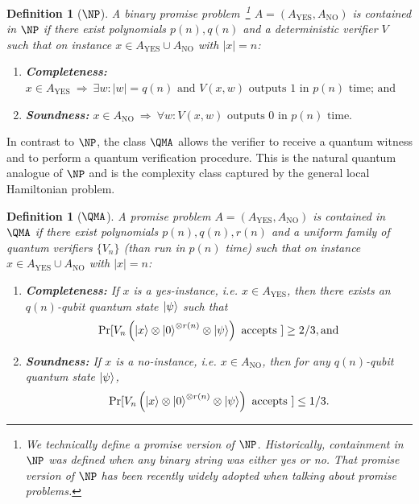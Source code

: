 \documentclass[11pt]{article}
\theoremstyle{plain}
\newtheorem{definition}[theorem]{Definition}
\begin{document}
\begin{definition}[$\NP$]
   A binary promise problem~\footnote{We technically define a promise version of $\NP$. Historically, containment in $\NP$ was defined when any binary string was either yes or no. That promise version of $\NP$ has been recently widely adopted when talking about promise problems.} $A = \left(A_{\mathrm{YES}}, A_{\mathrm{NO}}\right)$ is contained in $\NP$ if there exist polynomials $p(n), q(n)$ and a deterministic verifier $V$ such that on instance $x \in A_{\mathrm{YES}} \cup A_{\mathrm{NO}}$ with $|x| = n$:
    \begin{enumerate}
        \item \textbf{Completeness:} $x \in A_{\mathrm{YES}} \: \Longrightarrow \: \exists w: |w| = q(n) \text{ and } V(x, w) \text{ outputs } 1 \text{ in } p(n) \text{ time; and}$
        \item \textbf{Soundness:} $ x \in A_{\mathrm{NO}} \: \Longrightarrow \: \forall w: V(x, w) \text{ outputs } 0 \text{ in } p(n) \text{ time.}$
    \end{enumerate}
\end{definition}

In contrast to $\NP$, the class $\QMA$ allows the verifier to receive a quantum witness and to perform a quantum verification procedure.  This is the natural quantum analogue of $\NP$ and is the complexity class captured by the general local Hamiltonian problem.

\begin{definition}[$\QMA$]
   A promise problem $A = \left(A_{\mathrm{YES}}, A_{\mathrm{NO}}\right)$ is contained in $\QMA$ if there exist polynomials $p(n), q(n), r(n)$ and a uniform family of quantum verifiers $\{V_n\}$ (than run in $p(n)$ time) such that on instance $x \in A_{\mathrm{YES}} \cup A_{\mathrm{NO}}$ with $|x| = n$:
    \begin{enumerate}
        \item \textbf{Completeness:} If $x$ is a yes-instance, i.e. $x \in A_{\mathrm{YES}}$, then there exists an $q(n)$-qubit quantum state $\ket{\psi}$ such that
        \begin{equation}
            \Pr[V_n\left(\ket{x} \otimes \ket{0}^{\otimes r(n)} \otimes \ket{\psi}\right) \text{ accepts } ] \geq 2/3, \text{and}
        \end{equation}
        \item \textbf{Soundness:} If $x$ is a no-instance, i.e. $x \in A_{\mathrm{NO}}$, then for any $q(n)$-qubit quantum state $\ket{\psi}$, 
        \begin{equation}
            \Pr[V_n\left(\ket{x} \otimes \ket{0}^{\otimes r(n)} \otimes \ket{\psi}\right) \text{ accepts }] \leq 1/3.
        \end{equation}
    \end{enumerate}
\end{definition}
\end{document}
